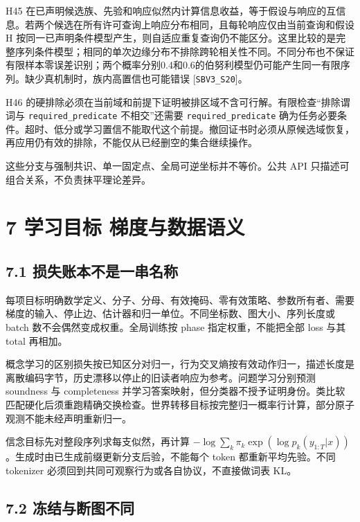 \documentclass[
  10pt,
]{article}
\begin{document}
H45
在已声明候选族、先验和响应似然内计算信息收益，等于假设与响应的互信息。若两个候选在所有许可查询上响应分布相同，且每轮响应仅由当前查询和假设
H
按同一已声明条件模型产生，则自适应重复查询仍不能区分。这里比较的是完整序列条件模型；相同的单次边缘分布不排除跨轮相关性不同。不同分布也不保证有限样本零误差识别；两个概率分别0.4和0.6的伯努利模型仍可能产生同一有限序列。缺少真机制时，族内高置信也可能错误
{[}\nolinkurl{SBV3_S20}{]}。

H46
的硬排除必须在当前域和前提下证明被排区域不含可行解。有限检查``排除谓词与
\nolinkurl{required_predicate} 不相交''还需要
\nolinkurl{required_predicate}
确为任务必要条件。超时、低分或学习置信不能取代这个前提。撤回证书时必须从原候选域恢复，再应用仍有效的排除，不能仅从已经删空的集合继续操作。

这些分支与强制共识、单一固定点、全局可逆坐标并不等价。公共 API
只描述可组合关系，不负责抹平理论差异。

\section{7 学习目标
梯度与数据语义}\label{ux5b66ux4e60ux76eeux6807-ux68afux5ea6ux4e0eux6570ux636eux8bedux4e49}

\subsection{7.1
损失账本不是一串名称}\label{ux635fux5931ux8d26ux672cux4e0dux662fux4e00ux4e32ux540dux79f0}

每项目标明确数学定义、分子、分母、有效掩码、零有效策略、参数所有者、需要梯度的输入、停止边、估计器和归一单位。不同坐标数、图大小、序列长度或
batch 数不会偶然变成权重。全局训练按 phase 指定权重，不能把全部 loss
与其 total 再相加。

概念学习的区别损失按已知区分对归一，行为交叉熵按有效动作归一，描述长度是离散编码字节，历史漂移以停止的旧读者响应为参考。问题学习分别预测
soundness 与 completeness
并学习答案映射，但分类器不授予证明身份。类比软匹配硬化后须重跑精确交换检查。世界转移目标按完整归一概率行计算，部分原子观测不能未经声明重新归一。

信念目标先对整段序列求每支似然，再计算
\(-\log\sum_k\pi_k\exp(\log p_k(y_{1:T}|x))\)。生成时由已生成前缀更新分支后验，不能每个
token 都重新平均先验。不同 tokenizer
必须回到共同可观察行为或各自协议，不直接做词表 KL。

\subsection{7.2
冻结与断图不同}\label{ux51bbux7ed3ux4e0eux65adux56feux4e0dux540c}
\end{document}
